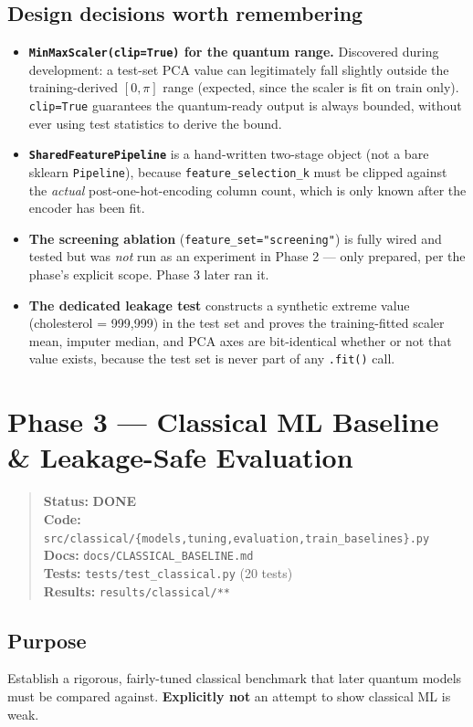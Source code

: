 \documentclass[11pt,a4paper]{article}
\newcommand{\code}[1]{\texttt{\small #1}}
\newcommand{\done}{\textcolor{donecolor}{\textbf{DONE}}}
\newcommand{\phasestatus}[5]{%
\begin{quote}\small\raggedright
\textbf{Status:} #1 \\
\textbf{Code:} #2 \\
\textbf{Docs:} #3 \\
\textbf{Tests:} #4 \\
\textbf{Results:} #5
\end{quote}}
\begin{document}
\subsection{Design decisions worth remembering}
\begin{itemize}[leftmargin=1.4em]
  \item \textbf{\code{MinMaxScaler(clip=True)} for the quantum range.} Discovered during development: a test-set PCA value can legitimately fall slightly outside the training-derived $[0,\pi]$ range (expected, since the scaler is fit on train only). \code{clip=True} guarantees the quantum-ready output is always bounded, without ever using test statistics to derive the bound.
  \item \textbf{\code{SharedFeaturePipeline}} is a hand-written two-stage object (not a bare sklearn \code{Pipeline}), because \code{feature\_selection\_k} must be clipped against the \emph{actual} post-one-hot-encoding column count, which is only known after the encoder has been fit.
  \item \textbf{The screening ablation} (\code{feature\_set="screening"}) is fully wired and tested but was \emph{not} run as an experiment in Phase 2 --- only prepared, per the phase's explicit scope. Phase 3 later ran it.
  \item \textbf{The dedicated leakage test} constructs a synthetic extreme value (cholesterol = 999{,}999) in the test set and proves the training-fitted scaler mean, imputer median, and PCA axes are bit-identical whether or not that value exists, because the test set is never part of any \code{.fit()} call.
\end{itemize}

\section{Phase 3 --- Classical ML Baseline \& Leakage-Safe Evaluation}
\label{sec:phase3}

\phasestatus{\done}{\code{src/classical/\{models,tuning,evaluation,train\_baselines\}.py}}{\code{docs/CLASSICAL\_BASELINE.md}}{\code{tests/test\_classical.py} (20 tests)}{\code{results/classical/**}}

\subsection{Purpose}
Establish a rigorous, fairly-tuned classical benchmark that later quantum models must be compared against. \textbf{Explicitly not} an attempt to show classical ML is weak.
\end{document}
